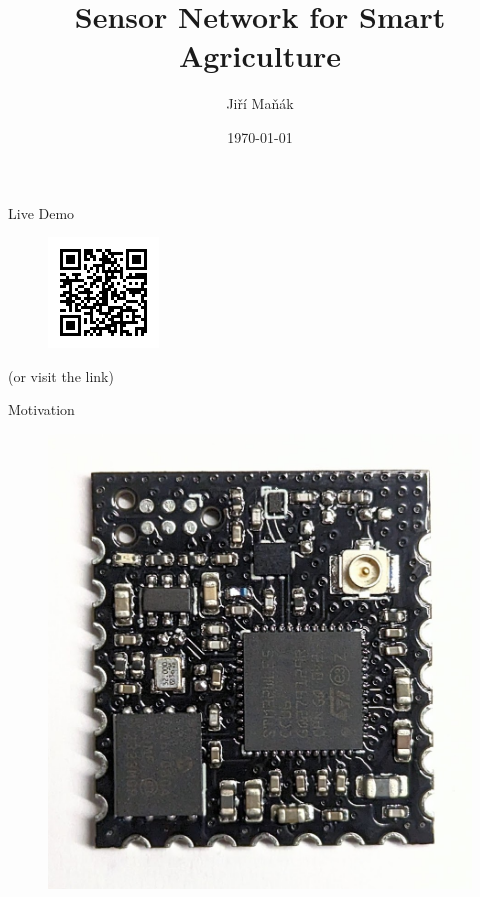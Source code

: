 \documentclass{beamer}
\title{Sensor Network for Smart Agriculture}
\author{Jiří Maňák}
\date{\today}
\begin{document}
\begin{frame}
\titlepage
\end{frame}


\begin{frame}{Live Demo}
\begin{figure}
    \centering
    \includegraphics[width=.5\linewidth]{img/qr.png}
\end{figure}
\begin{center}
    (or visit the link)
\end{center}
\end{frame}


\begin{frame}{Motivation}
\begin{figure}
    \centering
    \includegraphics[width=.65\linewidth]{img/module-v0.1.jpg}
\end{figure}
\end{frame}
\end{document}
